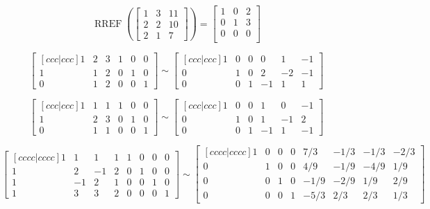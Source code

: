 \documentclass{article}
\DeclareMathOperator{\RREF}{RREF}
\begin{document}
  \[  \RREF\left(\begin{bmatrix}
    1 & 3 & 11  \\
    2 & 2 & 10  \\
    2 & 1 & 7 
  \end{bmatrix} \right) =
  \begin{bmatrix}
    1 & 0 & 2  \\
    0 & 1 & 3  \\
    0 & 0 & 0 \\
  \end{bmatrix}
\]



  \[\begin{bmatrix}[ccc|ccc]
  1 & 2 & 3 & 1 & 0 & 0  \\
  1 & 1 & 2   & 0 & 1 & 0 \\
  0 & 1 & 2   & 0 & 0 & 1
\end{bmatrix}\sim\begin{bmatrix}[ccc|ccc]
  1 & 0 & 0 & 0 & 1 & -1 \\
  0 & 1 & 0 & 2 & -2 & -1 \\
  0 & 0 & 1 & -1 & 1 & 1
\end{bmatrix}\]


  \[\begin{bmatrix}[ccc|ccc]
  1 & 1 & 1   & 1 & 0 & 0  \\
  1 & 2 & 3   & 0 & 1 & 0 \\
  0 & 1 & 1   & 0 & 0 & 1
\end{bmatrix}\sim\begin{bmatrix}[ccc|ccc]
  1 & 0 & 0 & 1 & 0 & -1 \\
  0 & 1 & 0 & 1 & -1 & 2 \\
  0 & 0 & 1 & -1 & 1 & -1
\end{bmatrix}\]

\[\begin{bmatrix}[cccc|cccc]
  1 & 1 & 1 & 1   & 1 & 0 & 0 & 0  \\
  1 & 2 & -1 & 2   & 0 & 1 & 0 & 0 \\
  1 & -1 & 2 & 1   & 0 & 0 & 1 & 0 \\
  1 & 3 & 3 & 2    & 0 & 0 & 0 & 1
\end{bmatrix}\sim\begin{bmatrix}[cccc|cccc]
  1 & 0 & 0 & 0 & 7/3 & -1/3 & -1/3 & -2/3 \\
  0 & 1 & 0 & 0 & 4/9 & -1/9 & -4/9 & 1/9 \\
  0 & 0 & 1 & 0 & -1/9 & -2/9 & 1/9 & 2/9 \\
  0 & 0 & 0 & 1 & -5/3 & 2/3 & 2/3 & 1/3
\end{bmatrix}\]
\end{document}
